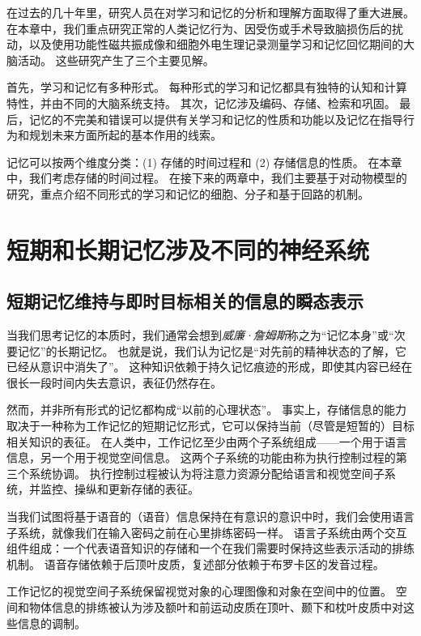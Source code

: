 在过去的几十年里，研究人员在对学习和记忆的分析和理解方面取得了重大进展。
在本章中，我们重点研究正常的人类记忆行为、因受伤或手术导致脑损伤后的扰动，以及使用功能性磁共振成像和细胞外电生理记录测量学习和记忆回忆期间的大脑活动。
这些研究产生了三个主要见解。


首先，学习和记忆有多种形式。
每种形式的学习和记忆都具有独特的认知和计算特性，并由不同的大脑系统支持。
其次，记忆涉及编码、存储、检索和巩固。
最后，记忆的不完美和错误可以提供有关学习和记忆的性质和功能以及记忆在指导行为和规划未来方面所起的基本作用的线索。


记忆可以按两个维度分类：(1) 存储的时间过程和 (2) 存储信息的性质。
在本章中，我们考虑存储的时间过程。
在接下来的两章中，我们主要基于对动物模型的研究，重点介绍不同形式的学习和记忆的细胞、分子和基于回路的机制。



\section{短期和长期记忆涉及不同的神经系统}

\subsection{短期记忆维持与即时目标相关的信息的瞬态表示}

当我们思考记忆的本质时，我们通常会想到\textit{威廉·詹姆斯}称之为“记忆本身”或“次要记忆”的长期记忆。
也就是说，我们认为记忆是“对先前的精神状态的了解，它已经从意识中消失了”。
这种知识依赖于持久记忆痕迹的形成，即使其内容已经在很长一段时间内失去意识，表征仍然存在。


然而，并非所有形式的记忆都构成“以前的心理状态”。
事实上，存储信息的能力取决于一种称为工作记忆的短期记忆形式，它可以保持当前（尽管是短暂的）目标相关知识的表征。
在人类中，工作记忆至少由两个子系统组成——一个用于语言信息，另一个用于视觉空间信息。
这两个子系统的功能由称为执行控制过程的第三个系统协调。
执行控制过程被认为将注意力资源分配给语言和视觉空间子系统，并监控、操纵和更新存储的表征。


当我们试图将基于语音的（语音）信息保持在有意识的意识中时，我们会使用语言子系统，就像我们在输入密码之前在心里排练密码一样。
语言子系统由两个交互组件组成：一个代表语音知识的存储和一个在我们需要时保持这些表示活动的排练机制。
语音存储依赖于后顶叶皮质，复述部分依赖于布罗卡区的发音过程。


工作记忆的视觉空间子系统保留视觉对象的心理图像和对象在空间中的位置。
空间和物体信息的排练被认为涉及额叶和前运动皮质在顶叶、颞下和枕叶皮质中对这些信息的调制。


